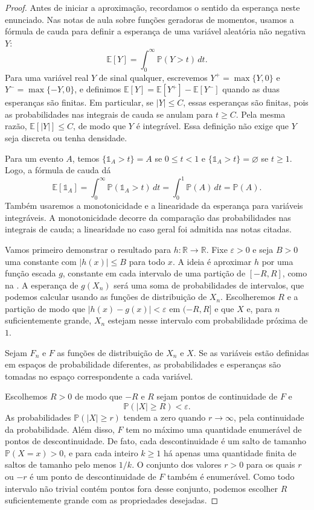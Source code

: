 \documentclass[12pt,portuguese]{article}
\theoremstyle{definition}
\theoremstyle{plainexercise}
\theoremstyle{starredexercise}
\theoremstyle{definition}
\begin{document}
\begin{proof}
Antes de iniciar a aproximação, recordamos o sentido da esperança neste
enunciado. Nas notas de aula sobre funções geradoras de momentos, usamos a
fórmula de cauda para definir a esperança de uma variável aleatória não
negativa $Y$:
\[
\mathbb{E}[Y]=\int_0^\infty\mathbb{P}(Y>t)\,dt.
\]
Para uma variável real $Y$ de sinal qualquer, escrevemos
$Y^+=\max\{Y,0\}$ e $Y^-=\max\{-Y,0\}$, e definimos
$\mathbb{E}[Y]=\mathbb{E}[Y^+]-\mathbb{E}[Y^-]$ quando as duas esperanças
são finitas. Em particular, se $|Y|\leqslant C$, essas esperanças são
finitas, pois as probabilidades nas integrais de cauda se anulam para
$t\geqslant C$. Pela mesma razão, $\mathbb{E}[|Y|]\leqslant C$, de modo que
$Y$ é integrável. Essa definição não exige que $Y$ seja discreta ou tenha
densidade.

\bigskip

Para um evento $A$, temos $\{\mathds{1}_A>t\}=A$ se $0\leqslant t<1$ e
$\{\mathds{1}_A>t\}=\varnothing$ se $t\geqslant1$. Logo, a fórmula de cauda dá
\[
\mathbb{E}[\mathds{1}_A]
=\int_0^\infty\mathbb{P}(\mathds{1}_A>t)\,dt
=\int_0^1\mathbb{P}(A)\,dt
=\mathbb{P}(A).
\]
Também usaremos a monotonicidade e a linearidade da esperança para variáveis
integráveis. A monotonicidade decorre da comparação das probabilidades nas
integrais de cauda; a linearidade no caso geral foi admitida nas notas citadas.


\bigskip


Vamos primeiro demonstrar o resultado para $h:\mathbb{R}\to\mathbb{R}$.
Fixe $\varepsilon>0$ e seja $B>0$ uma constante com $|h(x)|\leqslant B$ para
todo $x$. A ideia é aproximar $h$ por uma função escada $g$, constante em
cada intervalo de uma partição de $[-R,R]$, como na
. A esperança de $g(X_n)$ será uma
soma de probabilidades de intervalos, que podemos calcular usando as funções
de distribuição de $X_n$. Escolheremos $R$ e a partição de modo que
$|h(x)-g(x)|<\varepsilon$ em $(-R,R]$ e que $X$ e, para $n$ suficientemente
grande, $X_n$ estejam nesse intervalo com probabilidade próxima de $1$.

\bigskip

Sejam $F_n$ e $F$ as funções de distribuição de $X_n$ e $X$. Se as variáveis
estão definidas em espaços de probabilidade diferentes, as probabilidades e
esperanças são tomadas no espaço correspondente a cada variável.

Escolhemos $R>0$ de modo que $-R$ e $R$ sejam pontos de continuidade de $F$ e
\[
\mathbb{P}(|X|\geqslant R)<\varepsilon.
\]
As probabilidades $\mathbb{P}(|X|\geqslant r)$ tendem a zero quando
$r\to\infty$, pela continuidade da probabilidade. Além disso, $F$ tem no
máximo uma quantidade enumerável de pontos de descontinuidade. De fato, cada
descontinuidade é um salto de tamanho $\mathbb{P}(X=x)>0$, e para cada inteiro
$k\geqslant1$ há apenas uma quantidade finita de saltos de tamanho pelo menos
$1/k$. O conjunto dos valores $r>0$ para os quais $r$ ou $-r$ é um ponto de
descontinuidade de $F$ também é enumerável. Como todo intervalo não trivial
contém pontos fora desse conjunto, podemos escolher $R$ suficientemente
grande com as propriedades desejadas.


\end{proof}
\end{document}

